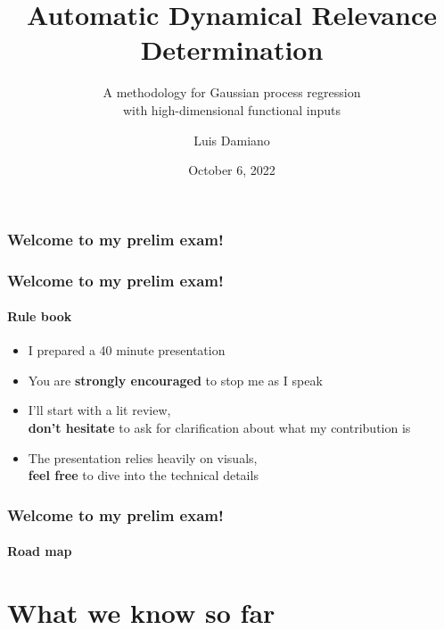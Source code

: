 \documentclass{snedecorbeamer}
\begin{document}
\title{Automatic Dynamical Relevance Determination}
\subtitle{A methodology for Gaussian process regression\\
  with high-dimensional functional inputs}
\author{Luis Damiano}
\date{October 6, 2022}

\begin{frame}
  \titlepage{}
\end{frame}

\begin{frame}
  \frametitle{Welcome to my prelim exam!}
\end{frame}

\begin{frame}
  \frametitle{Welcome to my prelim exam!}
  \framesubtitle{Rule book}

  \begin{itemize}[<+(1)->]
  \item I prepared a 40 minute presentation
  \item You are \textbf{strongly encouraged} to stop me as I speak
  \item I'll start with a lit review,\\
    \textbf{don't hesitate} to ask for clarification about what my contribution is
  \item The presentation relies heavily on visuals,\\
    \textbf{feel free} to dive into the technical details
  \end{itemize}
\end{frame}

\begin{frame}
  \frametitle{Welcome to my prelim exam!}
  \framesubtitle{Road map}

  \tableofcontents
\end{frame}

\section{What we know so far}
\end{document}
